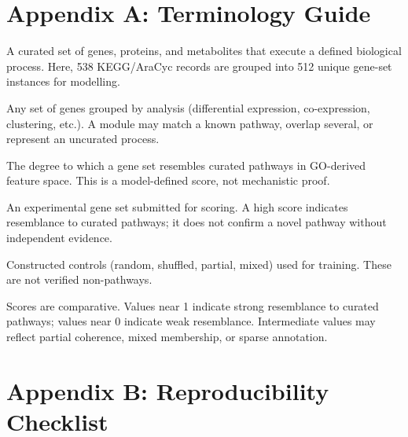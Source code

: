\documentclass[12pt,twoside]{article}
\begin{document}
\appendix

\section{Appendix A: Terminology Guide}
\label{app:terminology}

\begin{description}[style=nextline,leftmargin=1.5em]
\item[Pathway] A curated set of genes, proteins, and metabolites that execute a defined biological process. Here, 538 KEGG/AraCyc records are grouped into 512 unique gene-set instances for modelling.
\item[Gene module] Any set of genes grouped by analysis (differential expression, co-expression, clustering, etc.). A module may match a known pathway, overlap several, or represent an uncurated process.
\item[Pathway-like coherence] The degree to which a gene set resembles curated pathways in GO-derived feature space. This is a model-defined score, not mechanistic proof.
\item[Candidate gene set] An experimental gene set submitted for scoring. A high score indicates resemblance to curated pathways; it does not confirm a novel pathway without independent evidence.
\item[Negative gene set] Constructed controls (random, shuffled, partial, mixed) used for training. These are not verified non-pathways.
\item[Score interpretation] Scores are comparative. Values near 1 indicate strong resemblance to curated pathways; values near 0 indicate weak resemblance. Intermediate values may reflect partial coherence, mixed membership, or sparse annotation.
\end{description}

\section{Appendix B: Reproducibility Checklist}
\label{app:repro_checklist}
\end{document}
